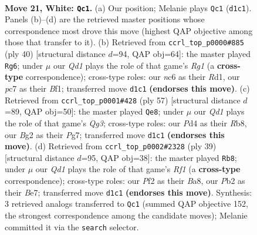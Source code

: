 \documentclass[11pt]{article}
\begin{document}
\clearpage

\begin{figure}[p]\centering
\begin{subfigure}{0.46\textwidth}\centering
\resizebox{\linewidth}{!}{%
\newchessgame
\chessboard[
  setfen={2b1k2r/2p1qp2/2n5/3p2N1/3P2np/1p5P/1P2PPB1/K2QB2R w k - 0 21},
  showmover=false,
  pgfstyle=straightmove, color=movearrow, markmove={d1-c1}
]}
\caption{}
\end{subfigure}\hfill
\begin{subfigure}{0.46\textwidth}\centering
\resizebox{\linewidth}{!}{%
\newchessgame
\chessboard[
  setfen={r1b2k1r/pp2q3/2pN1p2/2n5/1bPQ1p2/8/PP3P1P/2KR1BR1 w - - 0 21},
  showmover=false,
  pgfstyle=straightmove, color=movearrow, markmove={g1-g6}
]}
\caption{}
\end{subfigure}
\\[4pt]
\begin{subfigure}{0.46\textwidth}\centering
\resizebox{\linewidth}{!}{%
\newchessgame
\chessboard[
  setfen={1r4k1/6p1/1nQ1p1qp/p4p2/Pb1P1P2/1p6/1P3PBP/R1N2K2 b - - 2 29},
  showmover=false,
  pgfstyle=straightmove, color=movearrow, markmove={g6-e8}
]}
\caption{}
\end{subfigure}\hfill
\begin{subfigure}{0.46\textwidth}\centering
\resizebox{\linewidth}{!}{%
\newchessgame
\chessboard[
  setfen={b4rk1/4bp2/1q1p2pp/1N2n3/3QP3/1N6/1PP1B1PP/5R1K b - - 4 20},
  showmover=false,
  pgfstyle=straightmove, color=movearrow, markmove={f8-b8}
]}
\caption{}
\end{subfigure}
\caption{\textbf{Move 21, White: \texttt{Qc1}.} (a) Our position; Melanie plays \texttt{Qc1} (\texttt{d1c1}). Panels (b)--(d) are the retrieved master positions whose correspondence most drove this move (highest QAP objective among those that transfer to it). (b) Retrieved from \texttt{ccrl\_top\_p0000\#885} (ply 40) [structural distance $d$=94, QAP obj=64]: the master played \texttt{Rg6}; under $\mu$ our \emph{Qd1} plays the role of that game's \emph{Rg1} (a \textbf{cross-type} correspondence); cross-type roles: our \emph{n}c6 as their \emph{R}d1, our \emph{p}c7 as their \emph{B}f1; transferred move \texttt{d1c1} \textbf{(endorses this move)}. (c) Retrieved from \texttt{ccrl\_top\_p0001\#428} (ply 57) [structural distance $d$=89, QAP obj=50]: the master played \texttt{Qe8}; under $\mu$ our \emph{Qd1} plays the role of that game's \emph{Qg3}; cross-type roles: our \emph{P}d4 as their \emph{R}b8, our \emph{B}g2 as their \emph{P}g7; transferred move \texttt{d1c1} \textbf{(endorses this move)}. (d) Retrieved from \texttt{ccrl\_top\_p0002\#2328} (ply 39) [structural distance $d$=95, QAP obj=38]: the master played \texttt{Rb8}; under $\mu$ our \emph{Qd1} plays the role of that game's \emph{Rf1} (a \textbf{cross-type} correspondence); cross-type roles: our \emph{P}f2 as their \emph{B}a8, our \emph{P}b2 as their \emph{B}e7; transferred move \texttt{d1c1} \textbf{(endorses this move)}. Synthesis: 3 retrieved analogs transferred to \texttt{Qc1} (summed QAP objective 152, the strongest correspondence among the candidate moves); Melanie committed it via the \texttt{search} selector.}
\label{fig:thought-m40}
\end{figure}
\end{document}
